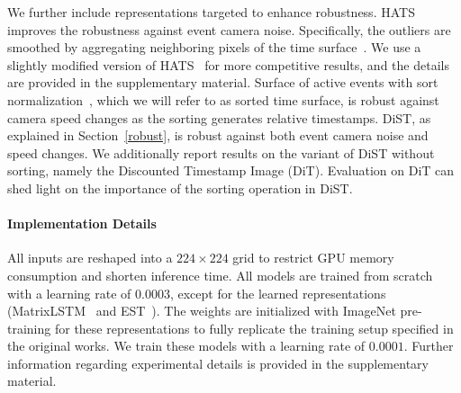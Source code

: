 We further include representations targeted to enhance robustness.
HATS~\cite{hats} improves the robustness against event camera noise.
Specifically, the outliers are smoothed by aggregating neighboring pixels of the time surface~\cite{hots}.
We use a slightly modified version of HATS~\cite{hats} for more competitive results, and the details are provided in the supplementary material.
Surface of active events with sort normalization~\cite{ace}, which we will refer to as sorted time surface, is robust against camera speed changes as the sorting generates relative timestamps. 
DiST, as explained in Section~\ref{robust}, is robust against both event camera noise and speed changes.
We additionally report results on the variant of DiST without sorting, namely the Discounted Timestamp Image (DiT).
Evaluation on DiT can shed light on the importance of the sorting operation in DiST.

\paragraph{Implementation Details}
All inputs are reshaped into a $224 \times 224$ grid to restrict GPU memory consumption and shorten inference time.
All models are trained from scratch with a learning rate of $0.0003$, except for the learned representations (MatrixLSTM~\cite{matrix_lstm} and EST~\cite{est}).
The weights are initialized with ImageNet pre-training for these representations to fully replicate the training setup specified in the original works.
We train these models with a learning rate of $0.0001$.
Further information regarding experimental details is provided in the supplementary material.


